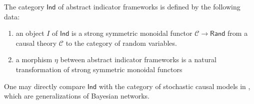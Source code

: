 \documentclass[sigconf]{acmart}
\newcommand{\Cat}[1]{\mathsf{#1}}
\def\Ind{\Cat{Ind}}
\def\Rand{\Cat{Rand}}
\def\Cor{\textnormal{Cor}}
\begin{document}
\begin{definition}The category $\Ind$ of abstract indicator frameworks is defined by the following data:
\begin{enumerate}
\item an object $I$ of $\Ind$ is a strong symmetric monoidal functor $\mathcal{C} \to \Rand$ from a causal theory $\mathcal{C}$ to the category of random variables.
\item a morphism $\eta$ between abstract indicator frameworks is a natural transformation of strong symmetric monoidal functors
\end{enumerate}
\end{definition}

One may directly compare $\Ind$ with the category of stochastic causal models in \cite{fong13}, which are generalizations of Bayesian networks.

%
%
%
%
%
%
\end{document}
